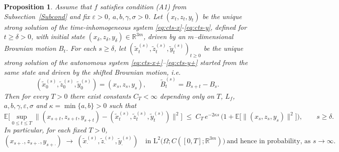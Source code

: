 \documentclass[11pt, a4paper,leqno]{amsart}
\newtheorem{proposition}{Proposition}[section]
\theoremstyle{definition}
\numberwithin{equation}{section}
\newcommand{\R}{\mathbb R}
\begin{document}
\begin{proposition}\label{Proppa}
Assume that $f$ satisfies condition \textnormal{(A1)} from Subsection~\ref{Subcond} and fix $\varepsilon>0$, $a,b,\gamma,\sigma>0$. Let $(x_t,z_t,y_t)$ be the unique strong
solution of the time-inhomogeneous system \eqref{eq:cts-x}-\eqref{eq:cts-y}, defined for $t\ge \delta>0$, with initial state $(x_\delta,z_\delta,y_\delta)\in\R^{3m}$, driven by an $m$–dimensional Brownian motion $B_t$. For each
$s\ge \delta$, let $(\tilde x^{(s)}_t,\tilde z^{(s)}_t,\tilde y^{(s)}_t)_{t\ge 0}$ be the unique strong
solution of the autonomous system \eqref{eq:cts-x+}–\eqref{eq:cts-y+} started from the same state
and driven by the shifted Brownian motion, i.e.
\[
(\tilde x^{(s)}_0,\tilde z^{(s)}_0,\tilde y^{(s)}_0)=(x_s,z_s,y_s),
\qquad \tilde B^{(s)}_t=B_{s+t}-B_s.
\]
Then for every $T>0$ there exist constants $C_T<\infty$ depending only
on $T$, $L_f$, $a,b,\gamma,\varepsilon,\sigma$ and $\kappa=\min\{a,b\}>0$ such that
\begin{equation}\label{eq:AA-L2}
\mathbb{E}\Big[\sup_{0\le t\le T}\big\|(x_{s+t},z_{s+t},y_{s+t})
-(\tilde x^{(s)}_t,\tilde z^{(s)}_t,\tilde y^{(s)}_t)\big\|^2\Big]
\;\le\; C_T\,e^{-2\kappa s}\,\Big(1+\mathbb{E}\bigl [\|(x_s,z_s,y_s)\|^2\bigr ]\Big),\qquad s\ge \delta.
\end{equation}
In particular, for each fixed $T>0$,
\[
(x_{s+\cdot},z_{s+\cdot},y_{s+\cdot})
\;\longrightarrow\;
(\tilde x^{(s)}_{\cdot},\tilde z^{(s)}_{\cdot},\tilde y^{(s)}_{\cdot})
\quad\text{in }\mathrm L^2\!\big(\Omega;C([0,T];\R^{3m})\big)\ \text{and hence in probability, as } s\to\infty.
\]
\end{proposition}
\end{document}
